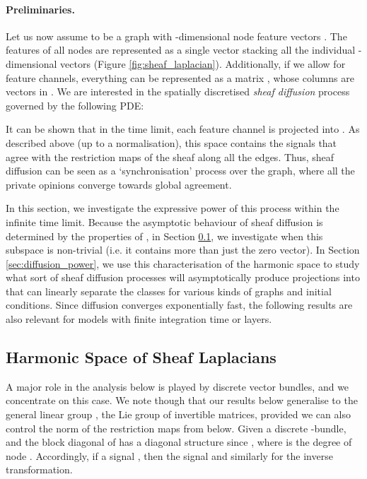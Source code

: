 \documentclass{article}
\begin{document}
\paragraph{Preliminaries.} Let us now assume  to be a graph with -dimensional node feature vectors . The features of all nodes are represented as a single vector  stacking all the individual -dimensional vectors (Figure \ref{fig:sheaf_laplacian}). Additionally, if we allow for  feature channels, everything can be represented as a matrix , whose columns are vectors in . We are interested in the spatially discretised {\em sheaf diffusion} process governed by the following PDE:

It can be shown that in the time limit, each feature channel is projected into  \citep{hansen2019toward}. As described above (up to a  normalisation), this space contains the signals that agree with the restriction maps of the sheaf along all the edges. Thus, sheaf diffusion can be seen as a `synchronisation' process over the graph, where all the private opinions converge towards global agreement. 

In this section, we investigate the expressive power of this process within the infinite time limit. Because the asymptotic behaviour of sheaf diffusion is determined by the properties of , in Section \ref{sec:harmonic_space}, we investigate when this subspace is non-trivial (i.e. it contains more than just the zero vector). In Section \ref{sec:diffusion_power}, we use this characterisation of the harmonic space to study what sort of sheaf diffusion processes will asymptotically produce projections into  that can linearly separate the classes for various kinds of graphs and initial conditions. Since diffusion converges exponentially fast, the following results are also relevant for models with finite integration time or layers. 

\subsection{Harmonic Space of Sheaf Laplacians}\label{sec:harmonic_space}

A major role in the analysis below is played by discrete vector bundles, and we concentrate on this case. We note though that our results below generalise to the general linear group , the Lie group of  invertible matrices, provided we can also control the norm of the restriction maps from below. Given a discrete -bundle,  and the block diagonal of  has a diagonal structure since , where  is the degree of node . Accordingly, if a signal , then the signal  and similarly for the inverse transformation.  
\end{document}
